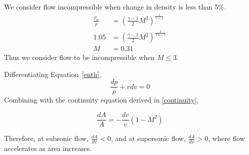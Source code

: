 \documentclass[12pt]{article}
\begin{document}
\begin{ex}
	We consider flow incompressible when change in density is less than 5\%.
	\begin{align*}
		\frac{\rho_0}{\rho} &= \left(\frac{\gamma-1}{2}M^2\right)^{\frac{1}{\gamma-1}} \\
		1.05 &= \left(\frac{\gamma-1}{2}M^2\right)^{\frac{1}{1.4-1}} \\
		M &= 0.31
	\end{align*}
	Thus we consider flow to be incompressible when $M \leq 3$.
\end{ex}

Differentiating Equation~\ref{enth},
$$\frac{dp}{\rho} + vdv = 0$$
Combining with the continuity equation derived in \ref{continuity},

$$\frac{dA}{A} = -\frac{dv}{v}(1-M^2)$$

Therefore, at subsonic flow, $\frac{dA}{dv} < 0$, and at supersonic flow, $\frac{dA}{dv} > 0$, where flow accelerates as area increases.
\end{document}
